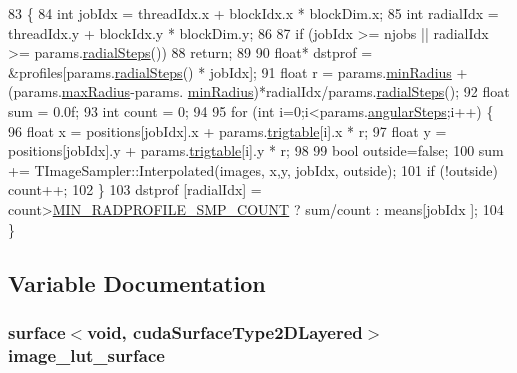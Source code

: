 \begin{DoxyCode}
83 \{
84     \textcolor{keywordtype}{int} jobIdx = threadIdx.x + blockIdx.x * blockDim.x;
85     \textcolor{keywordtype}{int} radialIdx = threadIdx.y + blockIdx.y * blockDim.y;
86 
87     \textcolor{keywordflow}{if} (jobIdx >= njobs || radialIdx >= params.\hyperlink{struct_z_l_u_t_params_a9579a1f453fa4966bbd7ca5c04a389d9}{radialSteps}()) 
88         \textcolor{keywordflow}{return};
89 
90     \textcolor{keywordtype}{float}* dstprof = &profiles[params.\hyperlink{struct_z_l_u_t_params_a9579a1f453fa4966bbd7ca5c04a389d9}{radialSteps}() * jobIdx];
91     \textcolor{keywordtype}{float} r = params.\hyperlink{struct_z_l_u_t_params_a1e53b221a353b5543b95ab8472c0e27f}{minRadius} + (params.\hyperlink{struct_z_l_u_t_params_a828d7befc2a73cbe77d5fead8987b916}{maxRadius}-params.
      \hyperlink{struct_z_l_u_t_params_a1e53b221a353b5543b95ab8472c0e27f}{minRadius})*radialIdx/params.\hyperlink{struct_z_l_u_t_params_a9579a1f453fa4966bbd7ca5c04a389d9}{radialSteps}();
92     \textcolor{keywordtype}{float} sum = 0.0f;
93     \textcolor{keywordtype}{int} count = 0;
94     
95     \textcolor{keywordflow}{for} (\textcolor{keywordtype}{int} i=0;i<params.\hyperlink{struct_z_l_u_t_params_a01c4d68849034d30553c2bbb353b9376}{angularSteps};i++) \{
96         \textcolor{keywordtype}{float} x = positions[jobIdx].x + params.\hyperlink{struct_z_l_u_t_params_a18e5051a3a4b118b45854c69977e2dbe}{trigtable}[i].x * r;
97         \textcolor{keywordtype}{float} y = positions[jobIdx].y + params.\hyperlink{struct_z_l_u_t_params_a18e5051a3a4b118b45854c69977e2dbe}{trigtable}[i].y * r;
98 
99         \textcolor{keywordtype}{bool} outside=\textcolor{keyword}{false};
100         sum += TImageSampler::Interpolated(images, x,y, jobIdx, outside);
101         \textcolor{keywordflow}{if} (!outside) count++;
102     \}
103     dstprof [radialIdx] = count>\hyperlink{_queued_tracker_8h_a1625167c310599739f4d73170413e64a}{MIN\_RADPROFILE\_SMP\_COUNT} ? sum/count : means[jobIdx
      ];
104 \}
\end{DoxyCode}


\subsection{Variable Documentation}
\subsubsection[{\texorpdfstring{image\+\_\+lut\+\_\+surface}{image_lut_surface}}]{\setlength{\rightskip}{0pt plus 5cm}surface$<$void, cuda\+Surface\+Type2\+D\+Layered$>$ image\+\_\+lut\+\_\+surface}\hypertarget{group__kernels_gaec033d7e15aebbae164cfe9c89b879eb}{}\label{group__kernels_gaec033d7e15aebbae164cfe9c89b879eb}
